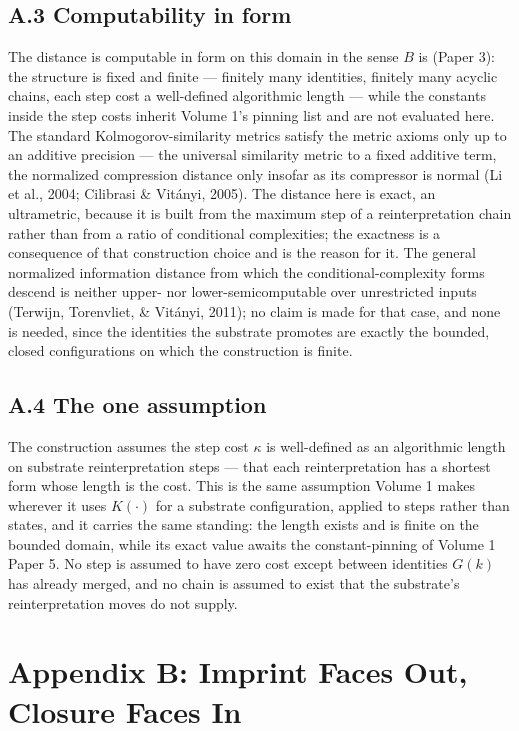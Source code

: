 \documentclass[11pt,oneside]{report}
\theoremstyle{definition}
\theoremstyle{remark}
\begin{document}
\subsection*{A.3 Computability in form}

The distance is computable in form on this domain in the sense \ensuremath{B}
is (Paper 3): the structure is fixed and finite --- finitely many identities,
finitely many acyclic chains, each step cost a well-defined algorithmic length
--- while the constants inside the step costs inherit Volume 1's pinning list
and are not evaluated here. The standard Kolmogorov-similarity metrics satisfy
the metric axioms only up to an additive precision --- the universal similarity
metric to a fixed additive term, the normalized compression distance only
insofar as its compressor is normal (Li et al., 2004; Cilibrasi \& Vit\'anyi,
2005). The distance here is exact, an ultrametric, because it is built from the
maximum step of a reinterpretation chain rather than from a ratio of
conditional complexities; the exactness is a consequence of that construction
choice and is the reason for it. The general normalized information distance
from which the conditional-complexity forms descend is neither upper- nor
lower-semicomputable over unrestricted inputs (Terwijn, Torenvliet, \&
Vit\'anyi, 2011); no claim is made for that case, and none is needed, since the
identities the substrate promotes are exactly the bounded, closed
configurations on which the construction is finite.

\subsection*{A.4 The one assumption}

The construction assumes the step cost \ensuremath{\kappa} is well-defined as
an algorithmic length on substrate reinterpretation steps --- that each
reinterpretation has a shortest form whose length is the cost. This is the same
assumption Volume 1 makes wherever it uses \ensuremath{K(\cdot)} for a substrate
configuration, applied to steps rather than states, and it carries the same
standing: the length exists and is finite on the bounded domain, while its
exact value awaits the constant-pinning of Volume 1 Paper 5. No step is assumed
to have zero cost except between identities \ensuremath{G(k)} has already
merged, and no chain is assumed to exist that the substrate's reinterpretation
moves do not supply.

\section*{Appendix B: Imprint Faces Out, Closure Faces In}
\end{document}
